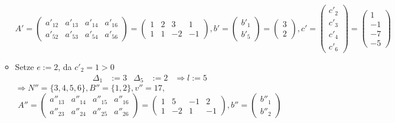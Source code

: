 \documentclass[a4paper,10pt]{article}
\begin{document}
\begin{enumerate}
\begin{itemize}
\[                 A' = \begin{pmatrix}
                        a'_{12} & a'_{13} & a'_{14} & a'_{16}\\
                        a'_{52} & a'_{53} & a'_{54} & a'_{56}
                     \end{pmatrix}
                   = \begin{pmatrix}
                        1 & 2 &  3 &  1 \\
                        1 & 1 & -2 & -1
                     \end{pmatrix}, 
                 b' = \begin{pmatrix}b'_1 \\ b'_5 \end{pmatrix} 
                   = \begin{pmatrix}3 \\ 2\end{pmatrix},
                 c' = \begin{pmatrix}c'_2 \\ c'_3 \\ c'_4 \\ c'_6\end{pmatrix} 
                   = \begin{pmatrix}1 \\ -1 \\ -7 \\ -5 \end{pmatrix}
                \]
        \item   Setze $e := 2$, da $c'_2 = 1 > 0$
                \begin{align*}
                    \Delta_1 &:= 3 & \Delta_5 &:= 2 & \Rightarrow l := 5
                \end{align*}
                $\Rightarrow N'' = \{3,4,5,6\}, B'' = \{1,2\}, v'' = 17,$
                \[
                 A'' = \begin{pmatrix}
                        a''_{13} & a''_{14} & a''_{15} & a''_{16}\\
                        a''_{23} & a''_{24} & a''_{25} & a''_{26}
                     \end{pmatrix}
                   = \begin{pmatrix}
                        1 &  5 & -1 &  2 \\
                        1 & -2 &  1 & -1
                     \end{pmatrix}, 
                 b'' = \begin{pmatrix}b''_1 \\ b''_2 \end{pmatrix} 
\]
\end{itemize}
\end{enumerate}
\end{document}
